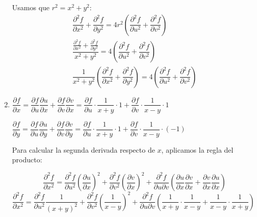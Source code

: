 \begin{enumerate}[label=\color{red}\textbf{\arabic*)}, leftmargin=*]
Usamos que $r^2=x^2+y^2$: \[  \begin{array}{c}
\dfrac{\partial^2 f}{\partial x^2}+\dfrac{\partial^2 f}{\partial y^2}=4r^2\left(\dfrac{\partial^2 f}{\partial u^2}+\dfrac{\partial^2 f}{\partial v^2}\right)\\
\dfrac{\frac{\partial^2 f}{\partial x^2}+\frac{\partial^2 f}{\partial y^2}}{x^2+y^2}=4\left(\dfrac{\partial^2 f}{\partial u^2}+\dfrac{\partial^2 f}{\partial v^2}\right)\\
\dfrac{1}{x^2+y^2}\left(\dfrac{\partial^2 f}{\partial x^2}+\dfrac{\partial^2 f}{\partial y^2}\right)=4\left(\dfrac{\partial^2 f}{\partial u^2}+\dfrac{\partial^2 f}{\partial v^2}\right)
\end{array}\]

\item {}

$\dfrac{\partial f}{\partial x}=\dfrac{\partial f}{\partial u}\dfrac{\partial u}{\partial x}+\dfrac{\partial f}{\partial v}\dfrac{\partial v}{\partial x}=\dfrac{\partial f}{\partial u}\cdot\dfrac{1}{x+y}\cdot1+\dfrac{\partial f}{\partial v}\cdot\dfrac{1}{x-y}\cdot 1$

$\dfrac{\partial f}{\partial y}=\dfrac{\partial f}{\partial u}\dfrac{\partial u}{\partial y}+\dfrac{\partial f}{\partial v}\dfrac{\partial v}{\partial y}=\dfrac{\partial f}{\partial u}\cdot\dfrac{1}{x+y}\cdot1+\dfrac{\partial f}{\partial v}\cdot\dfrac{1}{x-y}\cdot (-1)$

Para calcular la segunda derivada respecto de $x$, aplicamos la regla del producto: 


$$
\dfrac{\partial^2 f}{\partial x^2}=\dfrac{\partial^{2} f}{\partial u^{2}}\left( \dfrac{\partial u}{\partial x} \right)^{2}+\dfrac{\partial^{2}f}{\partial v^{2}}\left( \dfrac{\partial v}{\partial x} \right)^{2} + \dfrac{\partial^{2}f}{\partial u\partial v}\left( \dfrac{\partial u}{\partial x}\dfrac{\partial v}{\partial x}+\dfrac{ \partial v }{ \partial x }\dfrac{ \partial u }{ \partial x }   \right)
$$
$\dfrac{ \partial^{2}f }{ \partial x^{2} }=\dfrac{ \partial^{2}f }{ \partial u^{2} }\dfrac{1}{(x+y)^{2}}+\dfrac{ \partial^{2} f }{ \partial v^{2} }\left( \dfrac{1}{x-y} \right)^{2}+\dfrac{ \partial^{2} f }{ \partial u \partial v }\left(\dfrac{1}{x+y}\cdot\dfrac{1}{x-y}+\dfrac{1}{x-y}\cdot \dfrac{1}{x+y}\right)$


\end{enumerate}
